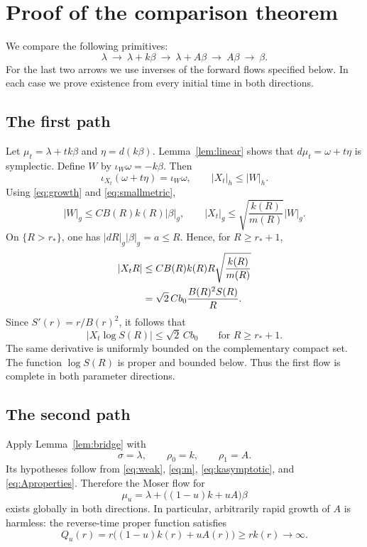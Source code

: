 \documentclass[11pt,a4paper]{article}
\theoremstyle{remark}
\newcommand{\abs}[1]{\lvert #1\rvert}
\numberwithin{equation}{section}
\begin{document}
\section{Proof of the comparison theorem}

We compare the following primitives:
\begin{equation}\label{eq:paths}
\lambda\ \longrightarrow\ \lambda+k\beta\
\longrightarrow\ \lambda+A\beta\
\longrightarrow\ A\beta\
\longrightarrow\ \beta.
\end{equation}
For the last two arrows we use inverses of the forward flows specified below. In each case we prove existence from every initial time in both directions.

\subsection*{The first path}
Let $\mu_t=\lambda+t k\beta$ and $\eta=d(k\beta)$. Lemma~\ref{lem:linear} shows that $d\mu_t=\omega+t\eta$ is symplectic. Define $W$ by $\iota_W\omega=-k\beta$. Then
\[
\iota_{X_t}(\omega+t\eta)=\iota_W\omega,
\qquad \abs{X_t}_h\le\abs{W}_h.
\]
Using \eqref{eq:growth} and \eqref{eq:smallmetric},
\[
\abs{W}_g\le C B(R)k(R)\abs{\beta}_g,
\qquad \abs{X_t}_g\le\sqrt{\frac{k(R)}{m(R)}}\abs{W}_g.
\]
On $\{R>r_*\}$, one has $\abs{dR}_g\abs{\beta}_g=a\le R$. Hence, for $R\ge r_*+1$,
\begin{align}
\abs{X_tR}
&\le C B(R)k(R)R\sqrt{\frac{k(R)}{m(R)}}\notag\\
&=\sqrt2\,Cb_0\frac{B(R)^2S(R)}R.
\label{eq:firstestimate}
\end{align}
Since $S'(r)=r/B(r)^2$, it follows that
\begin{equation}\label{eq:firstproper}
\abs{X_t\log S(R)}\le\sqrt2\,Cb_0
\qquad\text{for }R\ge r_*+1.
\end{equation}
The same derivative is uniformly bounded on the complementary compact set. The function $\log S(R)$ is proper and bounded below. Thus the first flow is complete in both parameter directions.

\subsection*{The second path}
Apply Lemma~\ref{lem:bridge} with
\[
\sigma=\lambda,\qquad \rho_0=k,\qquad \rho_1=A.
\]
Its hypotheses follow from \eqref{eq:weak}, \eqref{eq:m}, \eqref{eq:kasymptotic}, and \eqref{eq:Aproperties}. Therefore the Moser flow for
\[
\mu_u=\lambda+\bigl((1-u)k+uA\bigr)\beta
\]
exists globally in both directions. In particular, arbitrarily rapid growth of $A$ is harmless: the reverse-time proper function satisfies
\[
Q_u(r)=r\bigl((1-u)k(r)+uA(r)\bigr)\ge rk(r)\to\infty.
\]
\end{document}
